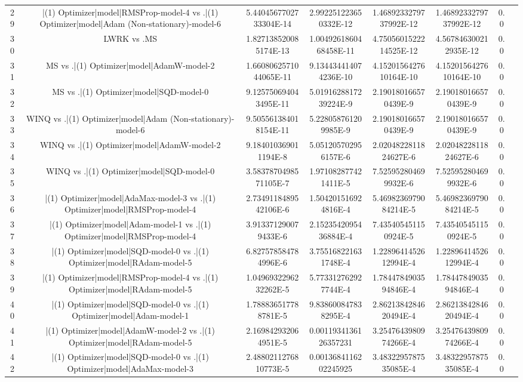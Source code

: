 \documentclass[a3paper,10pt]{article}
\begin{document}
\begin{table}[!htp]
\begin{tabular}{cccccccc}
29&|(1) Optimizer|model|RMSProp-model-4 vs .|(1) Optimizer|model|Adam (Non-stationary)-model-6&5.4404567702733304E-14&2.992251223650332E-12&1.4689233279737992E-12&1.4689233279737992E-12&0.0\\
30&LWRK vs .MS&1.827138520085174E-13&1.0049261860468458E-11&4.7505601522214525E-12&4.567846300212935E-12&0.0\\
31&MS vs .|(1) Optimizer|model|AdamW-model-2&1.6608062571044065E-11&9.134434414074236E-10&4.1520156427610164E-10&4.1520156427610164E-10&0.0\\
32&MS vs .|(1) Optimizer|model|SQD-model-0&9.125750694043495E-11&5.0191628817239224E-9&2.190180166570439E-9&2.190180166570439E-9&0.0\\
33&WINQ vs .|(1) Optimizer|model|Adam (Non-stationary)-model-6&9.505561384018154E-11&5.228058761209985E-9&2.190180166570439E-9&2.190180166570439E-9&0.0\\
34&WINQ vs .|(1) Optimizer|model|AdamW-model-2&9.184010369011194E-8&5.051205702956157E-6&2.0204822811824627E-6&2.0204822811824627E-6&0.0\\
35&WINQ vs .|(1) Optimizer|model|SQD-model-0&3.5837870498571105E-7&1.971082877421411E-5&7.525952804699932E-6&7.525952804699932E-6&0.0\\
36&|(1) Optimizer|model|AdaMax-model-3 vs .|(1) Optimizer|model|RMSProp-model-4&2.7349118489542106E-6&1.504201516924816E-4&5.4698236979084214E-5&5.4698236979084214E-5&0.0\\
37&|(1) Optimizer|model|Adam-model-1 vs .|(1) Optimizer|model|RMSProp-model-4&3.913371290079433E-6&2.1523542095436884E-4&7.435405451150924E-5&7.435405451150924E-5&0.0\\
38&|(1) Optimizer|model|SQD-model-0 vs .|(1) Optimizer|model|RAdam-model-5&6.827578584784996E-6&3.755168221631748E-4&1.2289641452612994E-4&1.2289641452612994E-4&0.0\\
39&|(1) Optimizer|model|RMSProp-model-4 vs .|(1) Optimizer|model|RAdam-model-5&1.0496932296232262E-5&5.773312762927744E-4&1.7844784903594846E-4&1.7844784903594846E-4&0.0\\
40&|(1) Optimizer|model|SQD-model-0 vs .|(1) Optimizer|model|Adam-model-1&1.788836517788781E-5&9.838600847838295E-4&2.8621384284620494E-4&2.8621384284620494E-4&0.0\\
41&|(1) Optimizer|model|AdamW-model-2 vs .|(1) Optimizer|model|RAdam-model-5&2.169842932064951E-5&0.0011934136126357231&3.2547643980974266E-4&3.2547643980974266E-4&0.0\\
42&|(1) Optimizer|model|SQD-model-0 vs .|(1) Optimizer|model|AdaMax-model-3&2.4880211276810773E-5&0.0013684116202245925&3.4832295787535085E-4&3.4832295787535085E-4&0.0\\

\end{tabular}
\end{table}
\end{document}
